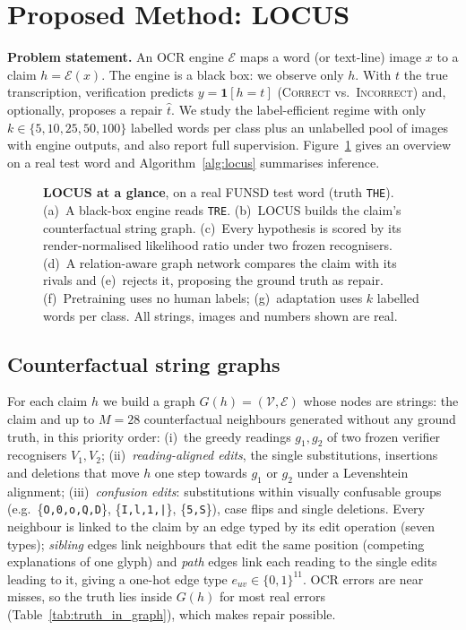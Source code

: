 \section{Proposed Method: LOCUS}
\label{sec:method}
\textbf{Problem statement.} An OCR engine $\mathcal{E}$ maps a word (or text-line) image $x$ to a claim
$h=\mathcal{E}(x)$. The engine is a black box: we observe only $h$. With $t$ the true transcription, verification
predicts $y=\mathbf{1}[h=t]$ (\textsc{Correct} vs.\ \textsc{Incorrect}) and, optionally, proposes a repair $\hat t$.
We study the label-efficient regime with only $k\in\{5,10,25,50,100\}$ labelled words per class plus an unlabelled pool
of images with engine outputs, and also report full supervision. Figure~\ref{fig:arch} gives an overview on a real
test word and Algorithm~\ref{alg:locus} summarises inference.

\begin{figure}[p]
\centering
\resizebox{0.93\linewidth}{!}{}
\caption{\textbf{LOCUS at a glance}, on a real FUNSD test word (truth \texttt{THE}). (a)~A black-box engine reads
\texttt{TRE}. (b)~LOCUS builds the claim's counterfactual string graph. (c)~Every hypothesis is scored by its
render-normalised likelihood ratio under two frozen recognisers. (d)~A relation-aware graph network compares the claim
with its rivals and (e)~rejects it, proposing the ground truth as repair. (f)~Pretraining uses no human labels;
(g)~adaptation uses $k$ labelled words per class. All strings, images and numbers shown are real.}
\label{fig:arch}
\end{figure}

\subsection{Counterfactual string graphs}
\label{sec:graph}
For each claim $h$ we build a graph $G(h)=(\mathcal{V},\mathcal{E})$ whose nodes are strings: the claim and up to
$M=28$ counterfactual neighbours generated without any ground truth, in this priority order: (i)~the greedy readings
$g_1,g_2$ of two frozen verifier recognisers $V_1,V_2$; (ii)~\emph{reading-aligned edits}, the single substitutions,
insertions and deletions that move $h$ one step towards $g_1$ or $g_2$ under a Levenshtein alignment; (iii)~\emph{confusion
edits}: substitutions within visually confusable groups (e.g.\ \{\texttt{O,0,o,Q,D}\}, \{\texttt{I,l,1,|}\},
\{\texttt{5,S}\}), case flips and single deletions. Every neighbour is linked to the claim by an edge typed by its edit
operation (seven types); \emph{sibling} edges link neighbours that edit the same position (competing explanations of
one glyph) and \emph{path} edges link each reading to the single edits leading to it, giving a one-hot edge type
$e_{uv}\in\{0,1\}^{11}$. OCR errors are near misses, so the truth lies inside $G(h)$ for most real errors
(Table~\ref{tab:truth_in_graph}), which makes repair possible.

